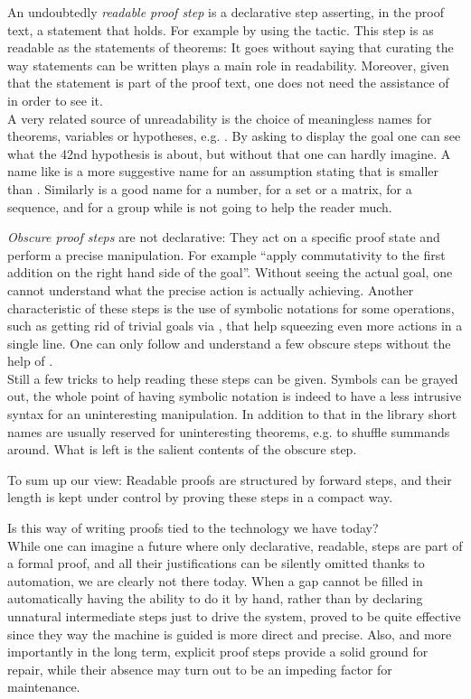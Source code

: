 An undoubtedly \emph{readable proof step} is a declarative step asserting,
in the proof text, a statement that holds. For example by using the
 tactic. This step is as readable as the statements of
theorems: It goes without saying that curating the way statements
can be written plays a main role in readability. Moreover, given that
the statement is part of the proof text, one does not need
the assistance of \Coq{} in order to see it.\\
A very related source of unreadability
is the choice of meaningless names for theorems, variables or
hypotheses, e.g. . By asking \Coq{} to display the goal one can see
what the 42nd hypothesis is about, but without that one can hardly
imagine. A name like  is a more suggestive name for an
assumption stating that  is smaller than .
Similarly  is a good name for a number,  for a set or a
matrix,  for a sequence, and  for a group while 
is not going to help the reader much.

\emph{Obscure proof steps} are not declarative: They act on a specific proof
state and perform a precise manipulation. For example ``apply
commutativity to the first addition on the right hand side of the
goal''. Without seeing the actual goal, one cannot
understand what the precise action is actually achieving.
Another characteristic of these steps is the use of symbolic
notations for some operations, such as getting rid of trivial goals
via \C{//}, that help squeezing even more actions in a single line.
One can only follow and understand a few obscure steps without the help
of \Coq{}.\\
Still a few tricks to help reading these steps can be given. Symbols
can be grayed out, the whole point of having symbolic notation is
indeed to have a less intrusive syntax for an uninteresting
manipulation.
In addition to that in the \mcbMC{} library short names are usually
reserved for uninteresting theorems, e.g.  to shuffle summands
around. What is left is the salient contents of the obscure step.

To sum up our view: Readable proofs are structured by forward steps,
and their length is kept under control by proving these steps in a
compact way.

Is this way of writing proofs tied to the technology we have today?\\
While one can imagine a future where only declarative, readable, steps
are part of a formal proof, and all their justifications can be
silently omitted thanks to automation, we are clearly not there today.
When a gap cannot be filled in automatically having the ability to do
it by hand, rather than by declaring unnatural intermediate steps just to
drive the system, proved to be quite effective since they way the
machine is guided is more direct and precise.  Also, and more
importantly in the long term, explicit proof steps provide a solid
ground for repair, while their absence may turn out to be an impeding
factor for maintenance.


